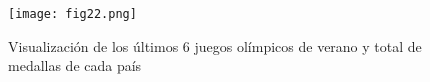 \begin{figure}[htp]
  \centering
  \texttt{[image: fig22.png]}
  \caption[Visualización de medallas en las Olimpiadas usando Paper.js]{Visualización de los últimos 6 juegos olímpicos de verano y total de medallas de cada país \protect\footnotemark}
  \label{fig:fig22}
\end{figure}

